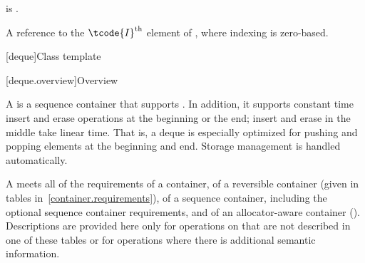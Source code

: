 \begin{itemdescr}
\pnum
\mandates
{} is .

\pnum
\returns
A reference to the $\tcode{I}^\text{th}$ element of ,
where indexing is zero-based.
\end{itemdescr}

[deque]{Class template }

[deque.overview]{Overview}

\pnum
A
%
is a sequence container that supports .
In addition, it supports constant time insert and erase operations at the beginning or the end;
insert and erase in the middle take linear time.
That is, a deque is especially optimized for pushing and popping elements at the beginning and end.
Storage management is handled automatically.

\pnum
A
meets all of the requirements of a container, of a reversible container
(given in tables in~\ref{container.requirements}), of a sequence container,
including the optional sequence container requirements, and of an allocator-aware container ().
Descriptions are provided here only for operations on
that are not described in one of these tables
or for operations where there is additional semantic information.

